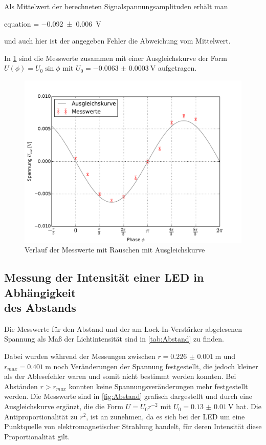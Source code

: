 	 
	
	Als Mittelwert der berechneten Signalspannungsamplituden erhält man
	\begin{empheq}{equation}
			 = \SI{-0.092(6)}{V}
			\label{eq:U0Noise_mean}
	\end{empheq}	
	und auch hier ist der angegeben Fehler die Abweichung vom Mittelwert.
	
	In \cref{fig:mitNoise} sind die Messwerte zusammen mit einer Ausgleichskurve der Form $U(\phi) = U_{0} \sin{\phi}$ mit 
	$U_{0} = \SI{-0.0063(3)}{\volt}$ aufgetragen.

	\begin{figure}[!h]
		\centering
		\includegraphics[scale=0.75]{Grafiken/MitNoise.pdf}
		\caption{Verlauf der Messwerte mit Rauschen mit Ausgleichskurve}
		\label{fig:mitNoise}
	\end{figure} 
\subsection{Messung der Intensität einer LED in Abhängigkeit  \\des Abstands}
	Die Messwerte für den Abstand und der am Lock-In-Verstärker abgelesenen Spannung als Maß der Lichtintensität
	sind in \cref{tab:Abstand} zu finden. 
	
	
	
	Dabei wurden während der Messungen zwischen $r = \SI{0.226(1)}{\meter}$ und $r_{max} = \SI{0.401}{\meter}$ 
	noch Veränderungen der Spannung festgestellt, die jedoch kleiner als der Ablesefehler waren und somit nicht bestimmt
	werden konnten. Bei Abständen $r > r_{max}$ konnten keine Spannungsveränderungen mehr festgestellt werden.
	Die Messwerte sind in \cref{fig:Abstand} grafisch dargestellt und durch eine Ausgleichskurve ergänzt, die 
	die Form $U = U_{0}r^{-2}$ mit $U_{0}= \SI{0.13(1)}{\volt}$ hat. Die Antiproportionalität zu $r^{2}$, ist an
	zunehmen, da es sich bei der LED um eine Punktquelle von elektromagnetischer Strahlung handelt, für deren Intensität
	diese Proportionalität gilt.

